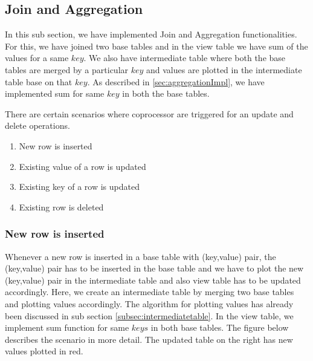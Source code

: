 \documentclass[11pt,a4paper,bibtotoc,idxtotoc,headsepline,footsepline,footexclude,BCOR12mm,DIV13]{scrbook}
\begin{document}
\newpage
\subsection{Join and Aggregation}
\label{subsec:joinandaggregation}
In this sub section, we have implemented Join and Aggregation functionalities. For this, we have joined two base tables and in the view table we have sum of the values for a same $key$. We also have intermediate table where both the base tables are merged by a particular $key$ and values are plotted in the intermediate table base on that $key$. As described in \ref{sec:aggregationImpl}, we have implemented sum for same $key$ in both the base tables. 


	

There are certain scenarios where coprocessor are triggered for an update and delete operations.

\begin{enumerate}
	\item New row is inserted
	\item Existing value of a row is updated
	\item Existing key of a row is updated
	\item Existing row is deleted
\end{enumerate}

\subsubsection{New row is inserted}
Whenever a new row is inserted in a base table with (key,value) pair, the (key,value) pair has to be inserted in the base table and we have to plot the new (key,value) pair in the intermediate table and also view table has to be updated accordingly. Here, we create an intermediate table by merging two base tables and plotting values accordingly. The algorithm for plotting values has already been discussed in sub section \ref{subsec:intermediatetable}. In the view table, we implement sum function for same $keys$ in both base tables.
The figure below describes the scenario in more detail. The updated table on the right has new values plotted in red.
\end{document}
